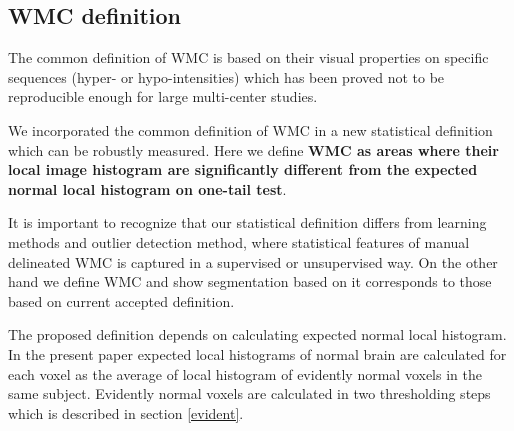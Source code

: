 \subsection{WMC definition} \label{definition}
The common definition of WMC is based on their visual properties on specific sequences (hyper- or hypo-intensities) which has been proved not to be reproducible enough for large multi-center studies. 
\par
We incorporated the common definition of WMC in a new statistical definition which can be robustly measured. Here we  define \textbf{WMC as areas where their local image histogram are significantly different from the expected normal local histogram on one-tail test}.
\par
It is important to recognize that our statistical definition differs from learning methods and outlier detection method, where statistical features of manual delineated WMC is captured in a supervised or unsupervised way.
On the other hand we define WMC and show segmentation based on it corresponds to those based on current accepted definition.
\par
The proposed definition depends on calculating expected normal local histogram. In the present paper expected local histograms of normal brain are calculated for each voxel as the average of local histogram of evidently normal voxels in the same subject. Evidently normal voxels are calculated in two thresholding steps which is described in section \ref{evident}.
  
  
  
  
  
  